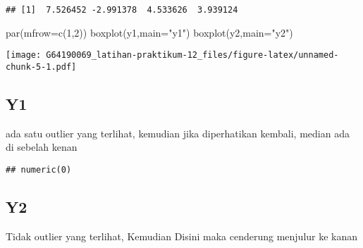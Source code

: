 \documentclass[
]{article}
\newenvironment{Shaded}{\begin{snugshade}}{\end{snugshade}}
\newcommand{\AttributeTok}[1]{\textcolor[rgb]{0.77,0.63,0.00}{#1}}
\newcommand{\ConstantTok}[1]{\textcolor[rgb]{0.00,0.00,0.00}{#1}}
\newcommand{\DecValTok}[1]{\textcolor[rgb]{0.00,0.00,0.81}{#1}}
\newcommand{\FunctionTok}[1]{\textcolor[rgb]{0.00,0.00,0.00}{#1}}
\newcommand{\NormalTok}[1]{#1}
\newcommand{\OtherTok}[1]{\textcolor[rgb]{0.56,0.35,0.01}{#1}}
\newcommand{\SpecialCharTok}[1]{\textcolor[rgb]{0.00,0.00,0.00}{#1}}
\newcommand{\StringTok}[1]{\textcolor[rgb]{0.31,0.60,0.02}{#1}}
\begin{document}
\begin{verbatim}
## [1]  7.526452 -2.991378  4.533626  3.939124
\end{verbatim}

\begin{Shaded}
\begin{Highlighting}[]
\FunctionTok{par}\NormalTok{(}\AttributeTok{mfrow=}\FunctionTok{c}\NormalTok{(}\DecValTok{1}\NormalTok{,}\DecValTok{2}\NormalTok{))}
\FunctionTok{boxplot}\NormalTok{(y1,}\AttributeTok{main=}\StringTok{"y1"}\NormalTok{)}
\FunctionTok{boxplot}\NormalTok{(y2,}\AttributeTok{main=}\StringTok{"y2"}\NormalTok{)}
\end{Highlighting}
\end{Shaded}

\texttt{[image: G64190069\_latihan-praktikum-12\_files/figure-latex/unnamed-chunk-5-1.pdf]}

\hypertarget{y1}{%
\subsection{Y1}\label{y1}}

ada satu outlier yang terlihat, kemudian jika diperhatikan kembali,
median ada di sebelah kenan

\begin{Shaded}
\end{Shaded}

\begin{verbatim}
## numeric(0)
\end{verbatim}

\hypertarget{y2}{%
\subsection{Y2}\label{y2}}

Tidak outlier yang terlihat, Kemudian Disini maka cenderung menjulur ke
kanan
\end{document}

